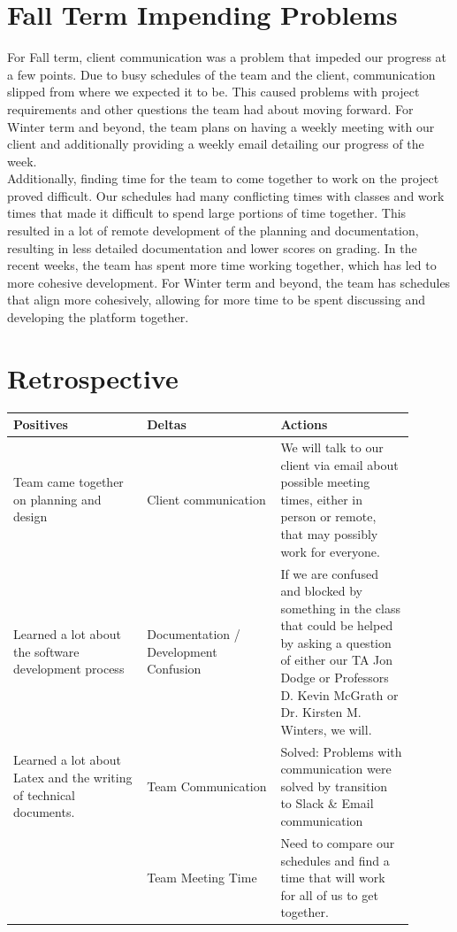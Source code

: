 \documentclass[onecolumn, draftclsnofoot,10pt, compsoc]{IEEEtran}
\begin{document}
\section{Fall Term Impending Problems}

For Fall term, client communication was a problem that impeded our progress 
at a few points. Due to busy schedules of the team and the client, communication 
slipped from where we expected it to be.
This caused problems with project requirements and other questions the team 
had about moving forward. For Winter term and beyond, the team plans on having 
a weekly meeting with our client and additionally providing a weekly email 
detailing our progress of the week. \\ 

\noindent Additionally, finding time for the team to come together to work 
on the project proved difficult.
Our schedules had many conflicting times with classes and work times that 
made it difficult to spend large portions of time together.
This resulted in a lot of remote development of the planning and documentation, 
resulting in less detailed documentation and lower scores on grading.
In the recent weeks, the team has spent more time working together, which has 
led to more cohesive development. For Winter term and beyond, the team has 
schedules that align more cohesively, allowing for more time to be spent 
discussing and developing the platform together.

\section{Retrospective}

\begin{tabular}{|p{0.3\linewidth}|p{0.3\linewidth}|p{0.3\linewidth}|}
\hline

	Positives 
	& Deltas 
	& Actions \\ \hline

	Team came together on planning and design 
	& Client communication 
	& We will talk to our client via email about possible meeting times, 
		either in person or remote, that may possibly work for everyone. \\ \hline

	Learned a lot about the software development process 
	& Documentation / Development Confusion 
	& If we are confused and blocked by something in the class that could 
		be helped by asking a question of either our TA Jon Dodge or Professors 
		D. Kevin McGrath or Dr. Kirsten M. Winters, we will. \\ \hline

	Learned a lot about Latex and the writing of technical documents. 
	& Team Communication 
	& Solved: Problems with communication were solved by 
		transition to Slack \& Email communication \\  \hline

	& Team Meeting Time 
	& Need to compare our schedules and find a time that will work 
		for all of us to get together. \\ \hline

\end{tabular}
\end{document}
